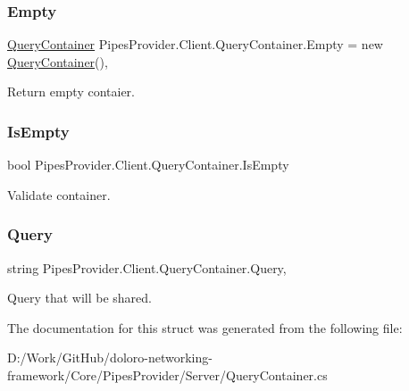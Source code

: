 \subsubsection{\texorpdfstring{Empty}{Empty}}
{\footnotesize\ttfamily \mbox{\hyperlink{struct_pipes_provider_1_1_client_1_1_query_container}{Query\+Container}} Pipes\+Provider.\+Client.\+Query\+Container.\+Empty = new \mbox{\hyperlink{struct_pipes_provider_1_1_client_1_1_query_container}{Query\+Container}}()\hspace{0.3cm}{\ttfamily [static]}, {\ttfamily [get]}}



Return empty contaier. 

\mbox{\label{struct_pipes_provider_1_1_client_1_1_query_container_ab2ceeaac61f04d4ce7e41bc8ea931a0f}} 
\subsubsection{\texorpdfstring{Is\+Empty}{IsEmpty}}
{\footnotesize\ttfamily bool Pipes\+Provider.\+Client.\+Query\+Container.\+Is\+Empty\hspace{0.3cm}{\ttfamily [get]}}



Validate container. 

\mbox{\label{struct_pipes_provider_1_1_client_1_1_query_container_ada0fa04c68e6aee41d3d811d699d01aa}} 
\subsubsection{\texorpdfstring{Query}{Query}}
{\footnotesize\ttfamily string Pipes\+Provider.\+Client.\+Query\+Container.\+Query\hspace{0.3cm}{\ttfamily [get]}, {\ttfamily [set]}}



Query that will be shared. 



The documentation for this struct was generated from the following file\+:\begin{DoxyCompactItemize}
\item 
D\+:/\+Work/\+Git\+Hub/doloro-\/networking-\/framework/\+Core/\+Pipes\+Provider/\+Server/Query\+Container.\+cs\end{DoxyCompactItemize}
